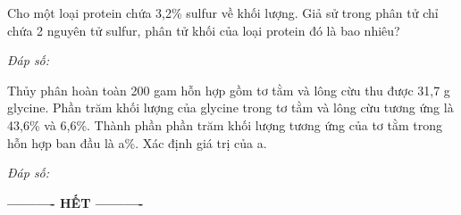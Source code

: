 \documentclass[11pt,a4paper]{article}
\def\loigiai#1{}
\begin{document}
\begin{ex}
Cho một loại protein chứa 3,2\% sulfur về khối lượng. Giả sử trong phân tử chỉ chứa 2 nguyên tử sulfur, phân tử khối của loại protein đó là bao nhiêu?
\loigiai{}
\end{ex}
\noindent\textit{Đáp số:} \dotfill\vspace{0.25cm}

\begin{ex}
Thủy phân hoàn toàn 200 gam hỗn hợp gồm tơ tằm và lông cừu thu được 31,7 g glycine. Phần trăm khối lượng của glycine trong tơ tằm và lông cừu tương ứng là 43,6\% và 6,6\%. Thành phần phần trăm khối lượng tương ứng của tơ tằm trong hỗn hợp ban đầu là a\%. Xác định giá trị của a.
\loigiai{}
\end{ex}
\noindent\textit{Đáp số:} \dotfill\vspace{0.25cm}

\vspace{0.1cm}
\begin{center}
	\textbf{---------- HẾT ----------}
\end{center}
\end{document}
